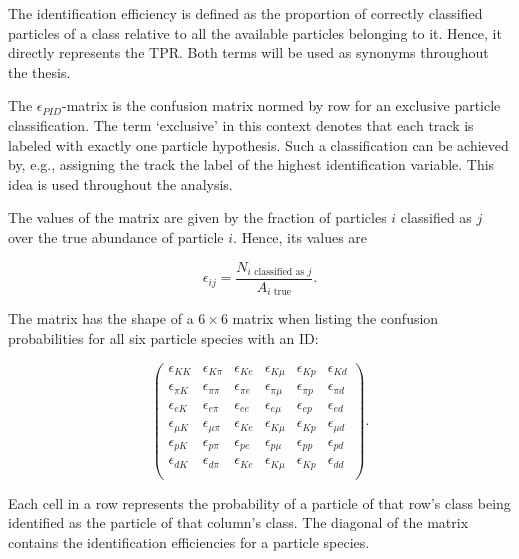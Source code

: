 The identification efficiency is defined as the proportion of correctly classified particles of a class relative to all the available particles belonging to it. Hence, it directly represents the TPR. Both terms will be used as synonyms throughout the thesis.

The $\epsilon_{PID}$-matrix is the confusion matrix normed by row for an exclusive particle classification. The term `exclusive' in this context denotes that each track is labeled with exactly one particle hypothesis. Such a classification can be achieved by, e.g., assigning the track the label of the highest identification variable. This idea is used throughout the analysis.

The values of the matrix are given by the fraction of particles $i$ classified as $j$ over the true abundance of particle $i$. Hence, its values are

\begin{equation}
	\epsilon_{i j} = \frac{N_{i \text{ classified as } j}}{A_{i \text{ true}}}.
\end{equation}

The matrix has the shape of a $6 \times 6$ matrix when listing the confusion probabilities for all six particle species with an ID:

\begin{equation}
	\begin{pmatrix}
		\epsilon_{K K} & \epsilon_{K \pi} & \epsilon_{K e} & \epsilon_{K \mu} & \epsilon_{K p} & \epsilon_{K d} \\
		\epsilon_{\pi K} & \epsilon_{\pi \pi} & \epsilon_{\pi e} & \epsilon_{\pi \mu} & \epsilon_{\pi p} & \epsilon_{\pi d} \\
		\epsilon_{e K} & \epsilon_{e \pi} & \epsilon_{e e} & \epsilon_{e \mu} & \epsilon_{e p} & \epsilon_{e d} \\
		\epsilon_{\mu K} & \epsilon_{\mu \pi} & \epsilon_{K e} & \epsilon_{K \mu} & \epsilon_{K p} & \epsilon_{\mu d} \\
		\epsilon_{p K} & \epsilon_{p \pi} & \epsilon_{p e} & \epsilon_{p \mu} & \epsilon_{p p} & \epsilon_{p d} \\
		\epsilon_{d K} & \epsilon_{d \pi} & \epsilon_{K e} & \epsilon_{K \mu} & \epsilon_{K p} & \epsilon_{d d} \\
	\end{pmatrix}.
\end{equation}

Each cell in a row represents the probability of a particle of that row's class being identified as the particle of that column's class. The diagonal of the matrix contains the identification efficiencies for a particle species.

